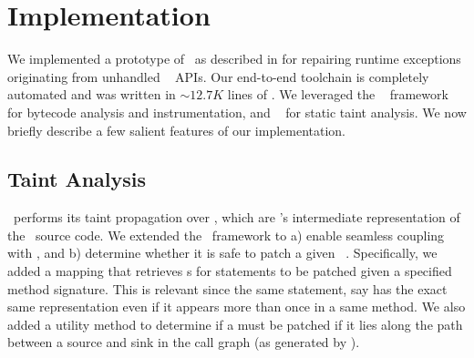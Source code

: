 \section{Implementation}
\label{sec:implementation}

We implemented a prototype of \tool\ as described in  for
repairing runtime exceptions originating from unhandled \java\ 
APIs. Our end-to-end toolchain is completely automated and was written in
$\sim$$12.7K$ lines of \java. We leveraged the \soot~\cite{soot} framework for
bytecode analysis and instrumentation, and \infoflow~\cite{infoflow} for static
taint analysis.
% 
% 
We now briefly describe a few salient features of our implementation.

\subsection{Taint Analysis}

\infoflow\ performs its taint propagation over , which are \soot's
intermediate representation of the \java\ source code. We extended the
\infoflow\ framework to a) enable seamless coupling with \soot, and b) determine
whether it is safe to patch a given \soot\ . Specifically, we added
a mapping that retrieves s for statements to be patched given a
specified method signature. This is relevant since the same statement, say
 has the exact same representation even if it appears more
than once in a same method. We also added a utility method to determine if a
 must be patched if it lies along the path between a source and sink 
in the call graph (as generated by \soot).


